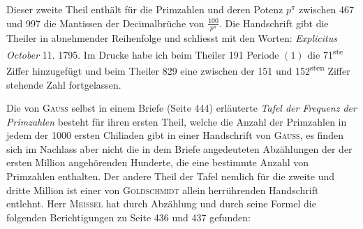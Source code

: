 Dieser zweite Theil enthält für die Primzahlen und deren Potenz $p^\pi$ zwischen 467 und 997 die Mantissen der Decimalbrüche von $\frac{100}{p^\pi}$. Die Handschrift gibt die Theiler in abnehmender Reihenfolge und schliesst mit den Worten: \textit{Explicitus October} 11. 1795. Im Drucke habe ich beim Theiler 191 Periode $(1)$ die 71\textsuperscript{ste} Ziffer hinzugefügt und beim Theiler 829 eine zwischen der 151 und 152\textsuperscript{sten} Ziffer stehende Zahl fortgelassen.
\par Die von \textsc{Gauss} selbst in einem Briefe (Seite 444) erläuterte \textit{Tafel der Frequenz der Primzahlen} besteht für ihren ersten Theil, welche die Anzahl der Primzahlen in jedem der 1000 ersten Chiliaden gibt in einer Handschrift von \textsc{Gauss}, es finden sich im Nachlass aber nicht die in dem Briefe angedeuteten Abzählungen der der ersten Million angehörenden Hunderte, die eine bestimmte Anzahl von Primzahlen enthalten. Der andere Theil der Tafel nemlich für die zweite und dritte Million ist einer von \textsc{Goldschmidt} allein herrührenden Handschrift entlehnt. Herr \textsc{Meissel} hat durch Abzählung und durch seine Formel die folgenden Berichtigungen zu Seite 436 und 437 gefunden:
